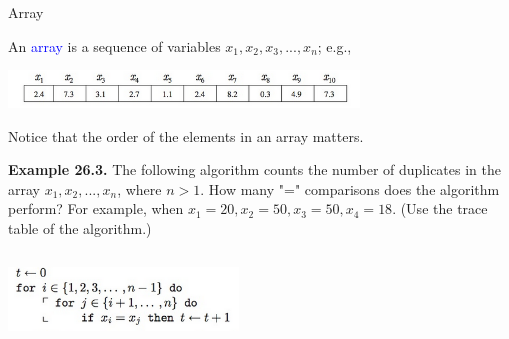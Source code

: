 \documentclass[aspectratio=169]{beamer}
\providecommand{\Blue}[1]{\textcolor{blue}{#1}}
\begin{document}
\begin{frame}[plain]{Array}
	
{\small 
		An \Blue{array} is a sequence of variables $x_1, x_2, x_3, ..., x_n$; e.g., 
		 \begin{center}
		 	\includegraphics[height=1cm]{./img/lecture26-fig3.png}
		 \end{center}
	Notice that the order of the elements in an array matters.%
	\pause
		 \medskip
		 
		{\bf Example 26.3.} The following algorithm counts the number of duplicates
		  in the array $x_1, x_2, ..., x_n$, where $n>1$. How many "=" comparisons does the algorithm perform? For example, 
		when $x_1=20, x_2=50, x_3=50, x_4=18$.  (Use the trace table of the algorithm.)
		  \begin{columns}
		  \begin{column}{0.5\textwidth}
		\begin{center}
			\includegraphics[height=1.7cm]{./img/lecture26-fig4.png} 
		\end{center}		
		 \end{column}
		 \begin{column}{0.5\textwidth}
		   \centering
		   
		   \vspace{0.7in}
		 \end{column}
		 \end{columns}
	}
	\vspace{.5in}
	
	
\end{frame}
\end{document}
